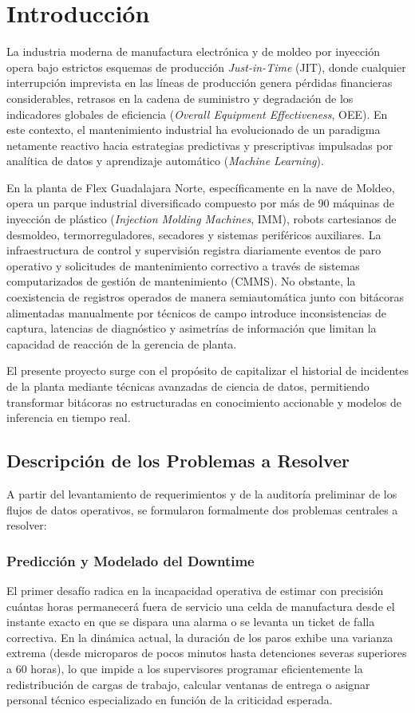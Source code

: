 \documentclass[conference]{IEEEtran}
\begin{document}
\section{Introducción}
La industria moderna de manufactura electrónica y de moldeo por inyección opera bajo estrictos esquemas de producción \textit{Just-in-Time} (JIT), donde cualquier interrupción imprevista en las líneas de producción genera pérdidas financieras considerables, retrasos en la cadena de suministro y degradación de los indicadores globales de eficiencia (\textit{Overall Equipment Effectiveness}, OEE). En este contexto, el mantenimiento industrial ha evolucionado de un paradigma netamente reactivo hacia estrategias predictivas y prescriptivas impulsadas por analítica de datos y aprendizaje automático (\textit{Machine Learning}).

En la planta de Flex Guadalajara Norte, específicamente en la nave de Moldeo, opera un parque industrial diversificado compuesto por más de 90 máquinas de inyección de plástico (\textit{Injection Molding Machines}, IMM), robots cartesianos de desmoldeo, termorreguladores, secadores y sistemas periféricos auxiliares. La infraestructura de control y supervisión registra diariamente eventos de paro operativo y solicitudes de mantenimiento correctivo a través de sistemas computarizados de gestión de mantenimiento (CMMS). No obstante, la coexistencia de registros operados de manera semiautomática junto con bitácoras alimentadas manualmente por técnicos de campo introduce inconsistencias de captura, latencias de diagnóstico y asimetrías de información que limitan la capacidad de reacción de la gerencia de planta.

El presente proyecto surge con el propósito de capitalizar el historial de incidentes de la planta mediante técnicas avanzadas de ciencia de datos, permitiendo transformar bitácoras no estructuradas en conocimiento accionable y modelos de inferencia en tiempo real.

\subsection{Descripción de los Problemas a Resolver}
A partir del levantamiento de requerimientos y de la auditoría preliminar de los flujos de datos operativos, se formularon formalmente dos problemas centrales a resolver:

\subsubsection{Predicción y Modelado del Downtime}
El primer desafío radica en la incapacidad operativa de estimar con precisión cuántas horas permanecerá fuera de servicio una celda de manufactura desde el instante exacto en que se dispara una alarma o se levanta un ticket de falla correctiva. En la dinámica actual, la duración de los paros exhibe una varianza extrema (desde microparos de pocos minutos hasta detenciones severas superiores a 60 horas), lo que impide a los supervisores programar eficientemente la redistribución de cargas de trabajo, calcular ventanas de entrega o asignar personal técnico especializado en función de la criticidad esperada. 
\end{document}
